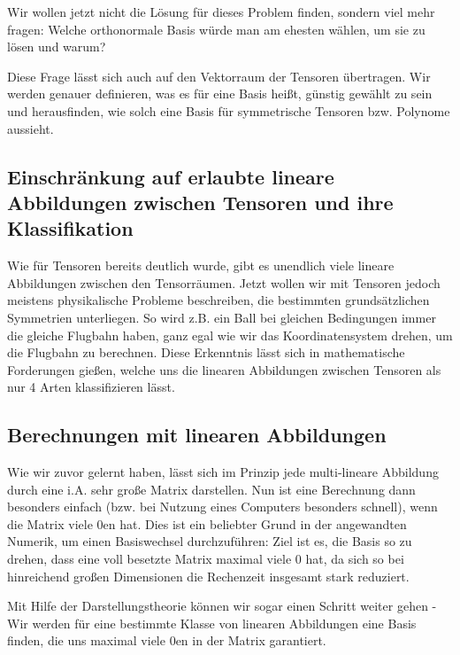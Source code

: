 Wir wollen jetzt nicht die Lösung für dieses Problem finden, sondern viel mehr fragen: Welche orthonormale Basis würde man am ehesten wählen, um sie zu lösen und warum?

Diese Frage lässt sich auch auf den Vektorraum der Tensoren übertragen. Wir werden genauer definieren, was es für eine Basis heißt, günstig gewählt zu sein und herausfinden, wie solch eine Basis für symmetrische Tensoren bzw. Polynome aussieht.

\subsection{Einschränkung auf erlaubte lineare Abbildungen zwischen Tensoren und ihre Klassifikation}
Wie für Tensoren bereits deutlich wurde, gibt es unendlich viele lineare Abbildungen zwischen den Tensorräumen. Jetzt wollen wir mit Tensoren jedoch meistens physikalische Probleme beschreiben, die bestimmten grundsätzlichen Symmetrien unterliegen. So wird z.B. ein Ball bei gleichen Bedingungen immer die gleiche Flugbahn haben, ganz egal wie wir das Koordinatensystem drehen, um die Flugbahn zu berechnen. Diese Erkenntnis lässt sich in mathematische Forderungen gießen, welche uns die linearen Abbildungen zwischen Tensoren als nur 4 Arten klassifizieren lässt.

\subsection{Berechnungen mit linearen Abbildungen}
Wie wir zuvor gelernt haben, lässt sich im Prinzip jede multi-lineare Abbildung durch eine i.A. sehr große Matrix darstellen. Nun ist eine Berechnung dann besonders einfach (bzw. bei Nutzung eines Computers besonders schnell), wenn die Matrix viele 0en hat. Dies ist ein beliebter Grund in der angewandten Numerik, um einen Basiswechsel durchzuführen: Ziel ist es, die Basis so zu drehen, dass eine voll besetzte Matrix maximal viele 0 hat, da sich so bei hinreichend großen Dimensionen die Rechenzeit insgesamt stark reduziert. 

Mit Hilfe der Darstellungstheorie können wir sogar einen Schritt weiter gehen - Wir werden für eine bestimmte Klasse von linearen Abbildungen eine Basis finden, die uns maximal viele 0en in der Matrix garantiert.

